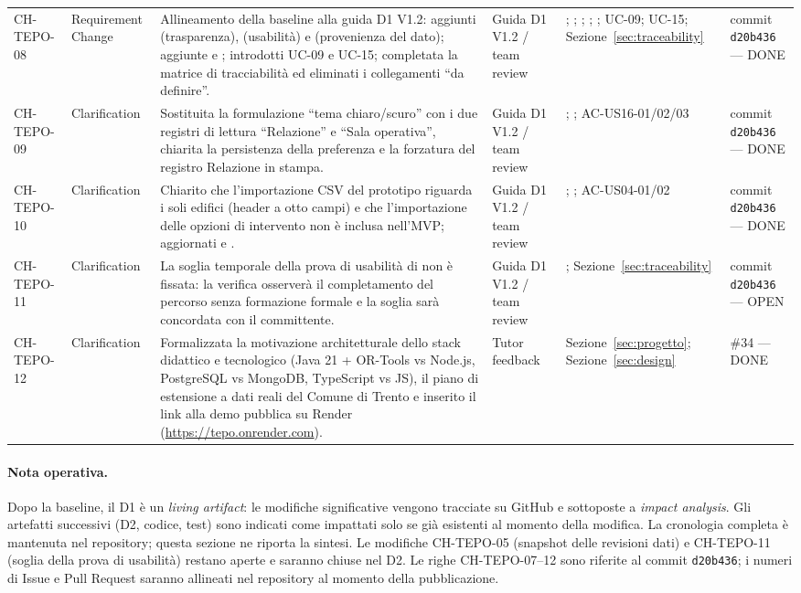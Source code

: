 \begin{longtable}{L{1.85cm} L{1.8cm} L{3.95cm} L{1.5cm} L{3.1cm} L{2.2cm}}
CH-TEPO-08 & Requirement Change & Allineamento della baseline alla guida D1 V1.2: aggiunti  (trasparenza),  (usabilità) e  (provenienza del dato); aggiunte  e ; introdotti UC-09 e UC-15; completata la matrice di tracciabilità ed eliminati i collegamenti ``da definire''. & Guida D1 V1.2 / team review & ; ; ; ; ; UC-09; UC-15; Sezione~\ref{sec:traceability} & commit \texttt{d20b436} --- DONE \\
CH-TEPO-09 & Clarification & Sostituita la formulazione ``tema chiaro/scuro'' con i due registri di lettura ``Relazione'' e ``Sala operativa'', chiarita la persistenza della preferenza e la forzatura del registro Relazione in stampa. & Guida D1 V1.2 / team review & ; ; AC-US16-01/02/03 & commit \texttt{d20b436} --- DONE \\
CH-TEPO-10 & Clarification & Chiarito che l'importazione CSV del prototipo riguarda i soli edifici (header a otto campi) e che l'importazione delle opzioni di intervento non è inclusa nell'MVP; aggiornati  e . & Guida D1 V1.2 / team review & ; ; AC-US04-01/02 & commit \texttt{d20b436} --- DONE \\
CH-TEPO-11 & Clarification & La soglia temporale della prova di usabilità di  non è fissata: la verifica osserverà il completamento del percorso senza formazione formale e la soglia sarà concordata con il committente. & Guida D1 V1.2 / team review & ; Sezione~\ref{sec:traceability} & commit \texttt{d20b436} --- OPEN \\
CH-TEPO-12 & Clarification & Formalizzata la motivazione architetturale dello stack didattico e tecnologico (Java 21 + OR-Tools vs Node.js, PostgreSQL vs MongoDB, TypeScript vs JS), il piano di estensione a dati reali del Comune di Trento e inserito il link alla demo pubblica su Render (\url{https://tepo.onrender.com}). & Tutor feedback & Sezione~\ref{sec:progetto}; Sezione~\ref{sec:design} & \#34 --- DONE \\
\end{longtable}
\endgroup

\paragraph{Nota operativa.}
Dopo la baseline, il D1 è un \emph{living artifact}: le modifiche significative vengono tracciate su GitHub e sottoposte a \emph{impact analysis}. Gli artefatti successivi (D2, codice, test) sono indicati come impattati solo se già esistenti al momento della modifica. La cronologia completa è mantenuta nel repository; questa sezione ne riporta la sintesi. Le modifiche CH-TEPO-05 (snapshot delle revisioni dati) e CH-TEPO-11 (soglia della prova di usabilità) restano aperte e saranno chiuse nel D2. Le righe CH-TEPO-07--12 sono riferite al commit \texttt{d20b436}; i numeri di Issue e Pull Request saranno allineati nel repository al momento della pubblicazione.
